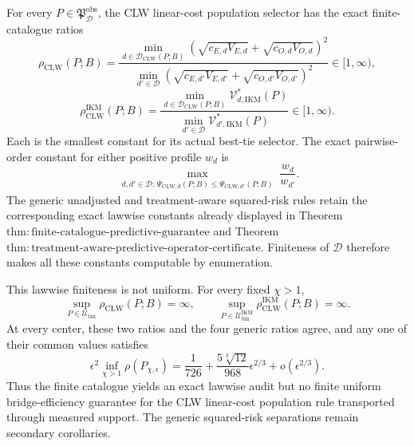 For every \(P\in\mathfrak P_{\mathcal D}^{\mathrm{obs}}\), the CLW linear-cost population selector has the exact finite-catalogue ratios
\[
 \rho_{\mathrm{CLW}}(P;B)=
 \frac{\min_{d\in\mathcal D_{\mathrm{CLW}}(P;B)}
 (\sqrt{c_{E,d}V_{E,d}}+\sqrt{c_{O,d}V_{O,d}})^2}
 {\min_{d'\in\mathcal D}
 (\sqrt{c_{E,d'}V_{E,d'}}+\sqrt{c_{O,d'}V_{O,d'}})^2}
 \in[1,\infty),                                           \tag{1}
\]
\[
 \rho_{\mathrm{CLW}}^{\mathrm{IKM}}(P;B)=
 \frac{\min_{d\in\mathcal D_{\mathrm{CLW}}(P;B)}
 \mathcal V_{d,\mathrm{IKM}}^*(P)}
 {\min_{d'\in\mathcal D}\mathcal V_{d',\mathrm{IKM}}^*(P)}
 \in[1,\infty).                                           \tag{2}
\]
Each is the smallest constant for its actual best-tie selector. The exact pairwise-order constant for either positive profile \(w_d\) is
\[
 \max_{\substack{d,d'\in\mathcal D:\,
 \Psi_{\mathrm{CLW},d}(P;B)\le\Psi_{\mathrm{CLW},d'}(P;B)}}
 \frac{w_d}{w_{d'}}.                                      \tag{3}
\]
The generic unadjusted and treatment-aware squared-risk rules retain the corresponding exact lawwise constants already displayed in Theorem~\(\mathrm{thm{:}finite\text{-}catalogue\text{-}predictive\text{-}guarantee}\) and Theorem~\(\mathrm{thm{:}treatment\text{-}aware\text{-}predictive\text{-}operator\text{-}certificate}\). Finiteness of \(\mathcal D\) therefore makes all these constants computable by enumeration.

This lawwise finiteness is not uniform. For every fixed \(\chi>1\),
\[
 \sup_{P\in\mathcal U_{\mathrm{bin}}}\rho_{\mathrm{CLW}}(P;B)=\infty,
 \qquad
 \sup_{P\in\mathcal U_{\mathrm{bin}}^{\mathrm{IKM}}}
 \rho_{\mathrm{CLW}}^{\mathrm{IKM}}(P;B)=\infty.          \tag{4}
\]
At every center, these two ratios and the four generic ratios agree, and any one of their common values satisfies
\[
 \epsilon^2\inf_{\chi>1}\rho(P_{\chi,\epsilon})
 =\frac1{726}+\frac{5\sqrt[3]{12}}{968}\epsilon^{2/3}
 +o(\epsilon^{2/3}).                                      \tag{5}
\]
Thus the finite catalogue yields an exact lawwise audit but no finite uniform bridge-efficiency guarantee for the CLW linear-cost population rule transported through measured support. The generic squared-risk separations remain secondary corollaries.
